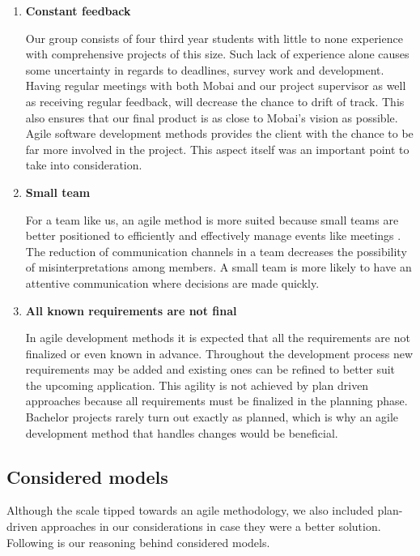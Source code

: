 \begin{enumerate}
    \item \textbf{Constant feedback} 
    
    \hspace{0,5cm}Our group consists of four third year students with little to none experience with comprehensive projects of this size. Such lack of experience alone causes some uncertainty in regards to deadlines, survey work and development. Having regular meetings with both Mobai and our project supervisor as well as receiving regular feedback, will decrease the chance to drift of track. This also ensures that our final product is as close to Mobai's vision as possible. Agile software development methods provides the client with the chance to be far more involved in the project. This aspect itself was an important point to take into consideration.
        
    \item \textbf{Small team}
    
    \hspace{0,5cm}For a team like us, an agile method is more suited because small teams are better positioned to efficiently and effectively manage events like meetings \cite{SmallTeams}. The reduction of communication channels in a team decreases the possibility of misinterpretations among members. A small team is more likely to have an attentive communication where decisions are made quickly.
    \newpage
    
    \item \textbf{All known requirements are not final}
    
    \hspace{0,5cm}In agile development methods it is expected that all the requirements are not finalized or even known in advance. Throughout the development process new requirements may be added and existing ones can be refined to better suit the upcoming application. This agility is not achieved by plan driven approaches because all requirements must be finalized in the planning phase. Bachelor projects rarely turn out exactly as planned, which is why an agile development method that handles changes would be beneficial. 
\end{enumerate}

\subsection{Considered models}
Although the scale tipped towards an agile methodology, we also included plan-driven approaches in our considerations in case they were a better solution. Following is our reasoning behind considered models.  

